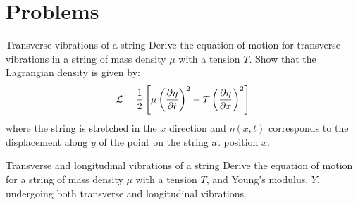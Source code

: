 %
\section{Problems}
\begin{problem}{Transverse vibrations of a string}
Derive the equation of motion for transverse vibrations in a string of mass density $\mu$ with a tension $T$. Show that the Lagrangian density is given by:
\begin{align*}
\mathcal{L}=\frac{1}{2}\left[\mu\left(\frac{\partial\eta}{\partial t}\right)^2-T\left(\frac{\partial\eta}{\partial x}\right)^2\right]
\end{align*}
where the string is stretched in the $x$ direction and $\eta(x,t)$ corresponds to the displacement along $y$ of the point on the string at position $x$.
\end{problem}

\begin{problem}{Transverse and longitudinal vibrations of a string}
Derive the equation of motion for a string of mass density $\mu$ with a tension $T$, and Young's modulus, $Y$, undergoing both transverse and longitudinal vibrations. 
\end{problem}